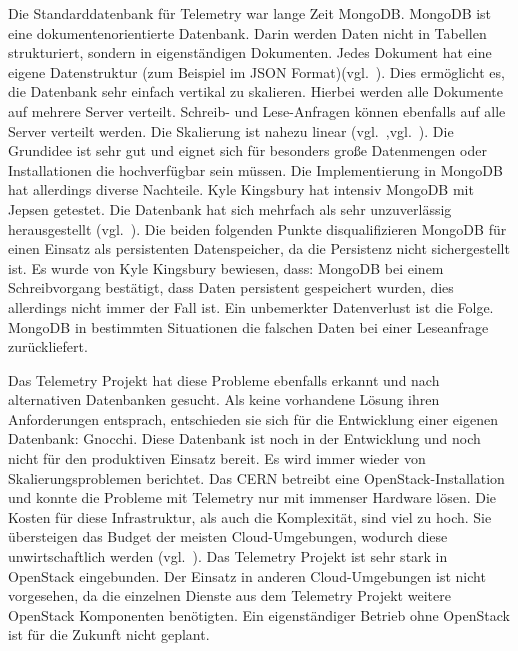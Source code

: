 \begin{outline}
  \1 Die Standarddatenbank für Telemetry war lange Zeit MongoDB\@. MongoDB ist
  eine dokumentenorientierte Datenbank. Darin werden Daten nicht in Tabellen
  strukturiert, sondern in eigenständigen Dokumenten. Jedes Dokument hat eine
  eigene Datenstruktur (zum Beispiel im \gls{JSON}
  Format)(vgl.~\cite{Dokumentenorientierte_Datenbank}). Dies ermöglicht es, die
  Datenbank sehr einfach vertikal zu skalieren. Hierbei werden alle Dokumente
  auf mehrere Server verteilt. Schreib- und Lese\hyp{}Anfragen können ebenfalls
  auf alle Server verteilt werden. Die Skalierung ist nahezu linear
  (vgl.~\cite{MongoDB_Architecture},vgl.~\cite{What_is_MongoDB}). Die Grundidee
  ist sehr gut und eignet sich für besonders große Datenmengen oder
  Installationen die hochverfügbar sein müssen. Die Implementierung in MongoDB
  hat allerdings diverse Nachteile. Kyle Kingsbury hat intensiv MongoDB mit
  \gls{Jepsen} getestet. Die Datenbank hat sich mehrfach als sehr unzuverlässig
  herausgestellt (vgl.~\cite{MongoDB_on_Jepsen}). Die beiden folgenden Punkte
  disqualifizieren MongoDB für einen Einsatz als persistenten Datenspeicher, da
  die Persistenz nicht sichergestellt ist. Es wurde von Kyle Kingsbury
  bewiesen, dass:
    \2 MongoDB bei einem Schreibvorgang bestätigt, dass Daten persistent
    gespeichert wurden, dies allerdings nicht immer der Fall ist. Ein
    unbemerkter Datenverlust ist die Folge.
    \2 MongoDB in bestimmten Situationen die falschen Daten bei einer
    Leseanfrage zurückliefert.

  \1 Das Telemetry Projekt hat diese Probleme ebenfalls erkannt und nach
  alternativen Datenbanken gesucht. Als keine vorhandene Lösung ihren
  Anforderungen entsprach, entschieden sie sich für die Entwicklung einer
  eigenen Datenbank: \gls{Gnocchi}. Diese Datenbank ist noch in der Entwicklung
  und noch nicht für den produktiven Einsatz bereit.
  \1 Es wird immer wieder von Skalierungsproblemen berichtet. Das CERN betreibt
  eine OpenStack\hyp{}Installation und konnte die Probleme mit Telemetry nur
  mit immenser Hardware lösen. Die Kosten für diese Infrastruktur, als auch die
  Komplexität, sind viel zu hoch. Sie übersteigen das Budget der meisten
  \gls{Cloud}\hyp{}Umgebungen, wodurch diese unwirtschaftlich werden
  (vgl.~\cite{OpenStack_CERN}).
  \1 Das Telemetry Projekt ist sehr stark in OpenStack eingebunden. Der Einsatz
  in anderen \gls{Cloud}\hyp{}Umgebungen ist nicht vorgesehen, da die einzelnen
  Dienste aus dem Telemetry Projekt weitere OpenStack Komponenten benötigten.
  Ein eigenständiger Betrieb ohne OpenStack ist für die Zukunft nicht geplant.
\end{outline}

